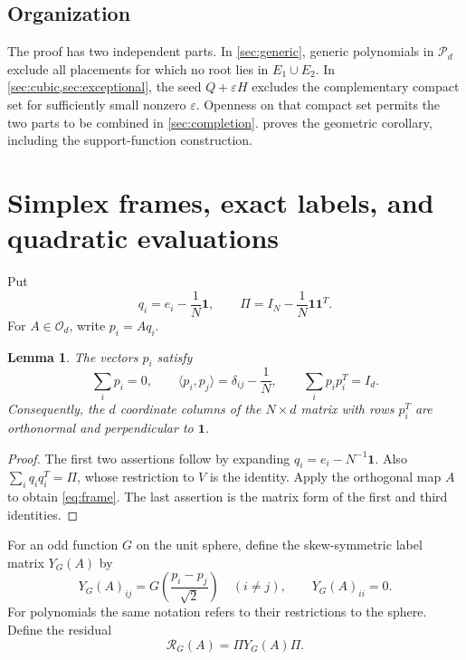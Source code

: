 \documentclass[11pt,reqno]{amsart}
\newtheorem{lemma}[lemma]{Lemma}
\theoremstyle{definition}
\theoremstyle{remark}
\numberwithin{equation}{section}
\newcommand{\one}{\mathbf 1}
\newcommand{\eps}{\varepsilon}
\newcommand{\Orth}{\mathcal O_d}
\newcommand{\Pol}{\mathcal P_d}
\newcommand{\ip}[2]{\langle #1,#2\rangle}
\begin{document}
\subsection{Organization}
The proof has two independent parts. In \cref{sec:generic}, generic
polynomials in $\Pol$ exclude all placements for which no root lies in
$E_1\cup E_2$. In \cref{sec:cubic,sec:exceptional}, the seed
$Q+\eps H$ excludes the complementary compact set for sufficiently
small nonzero $\eps$. Openness on that compact set permits the two
parts to be combined in \cref{sec:completion}.
 proves the geometric corollary, including the
support-function construction.

\section{Simplex frames, exact labels, and quadratic evaluations}
\label{sec:linear}

Put
\[
 q_i=e_i-\frac1N\one,\qquad
 \Pi=I_N-\frac1N\one\one^T.
\]
For $A\in\Orth$, write $p_i=Aq_i$.

\begin{lemma}\label{lem:frame}
The vectors $p_i$ satisfy
\begin{equation}\label{eq:frame}
 \sum_i p_i=0,\qquad
 \ip{p_i}{p_j}=\delta_{ij}-\frac1N,\qquad
 \sum_i p_ip_i^T=I_d.
\end{equation}
Consequently, the $d$ coordinate columns of the $N\times d$ matrix
with rows $p_i^T$ are orthonormal and perpendicular to $\one$.
\end{lemma}
\begin{proof}
The first two assertions follow by expanding $q_i=e_i-N^{-1}\one$.
Also $\sum_iq_iq_i^T=\Pi$, whose restriction to $V$ is the identity.
Apply the orthogonal map $A$ to obtain \eqref{eq:frame}. The last
assertion is the matrix form of the first and third identities.
\end{proof}

For an odd function $G$ on the unit sphere, define the skew-symmetric
label matrix $Y_G(A)$ by
\begin{equation}\label{eq:labels}
 Y_G(A)_{ij}=G\!\left(\frac{p_i-p_j}{\sqrt2}\right)
 \quad(i\ne j),\qquad Y_G(A)_{ii}=0.
\end{equation}
For polynomials the same notation refers to their restrictions to the
sphere. Define the residual
\begin{equation}\label{eq:residual}
 \mathcal R_G(A)=\Pi Y_G(A)\Pi.
\end{equation}
\end{document}
